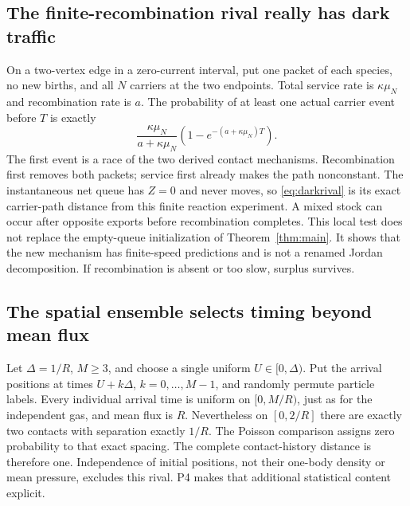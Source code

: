 \documentclass[11pt]{article}
\theoremstyle{definition}\newtheorem{definition}[theorem]{Definition}
\theoremstyle{remark}\newtheorem{remark}[theorem]{Remark}
\begin{document}
\subsection{The finite-recombination rival really has dark traffic}
On a two-vertex edge in a zero-current interval, put one packet of each species, no new births, and all $N$ carriers at the two endpoints. Total service rate is $\kappa\mu_N$ and recombination rate is $a$. The probability of at least one actual carrier event before $T$ is exactly
\begin{equation}
 \frac{\kappa\mu_N}{a+\kappa\mu_N}
       \left(1-e^{-(a+\kappa\mu_N)T}\right).
 \label{eq:darkrival}
\end{equation}
The first event is a race of the two derived contact mechanisms. Recombination first removes both packets; service first already makes the path nonconstant. The instantaneous net queue has $Z=0$ and never moves, so \eqref{eq:darkrival} is its exact carrier-path distance from this finite reaction experiment. A mixed stock can occur after opposite exports before recombination completes. This local test does not replace the empty-queue initialization of Theorem~\ref{thm:main}. It shows that the new mechanism has finite-speed predictions and is not a renamed Jordan decomposition. If recombination is absent or too slow, surplus survives.

\subsection{The spatial ensemble selects timing beyond mean flux}
Let $\Delta=1/R$, $M\ge3$, and choose a single uniform $U\in[0,\Delta)$. Put the arrival positions at times $U+k\Delta$, $k=0,\ldots,M-1$, and randomly permute particle labels. Every individual arrival time is uniform on $[0,M/R)$, just as for the independent gas, and mean flux is $R$. Nevertheless on $[0,2/R]$ there are exactly two contacts with separation exactly $1/R$. The Poisson comparison assigns zero probability to that exact spacing. The complete contact-history distance is therefore one. Independence of initial positions, not their one-body density or mean pressure, excludes this rival. P4 makes that additional statistical content explicit.
\end{document}
